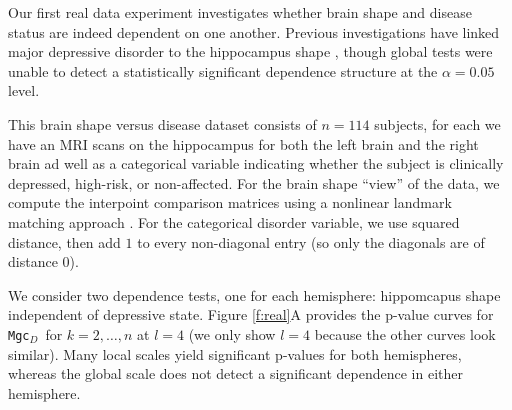 \documentclass[11pt]{article}
\providecommand{\sct}[1]{{\sc \texttt{#1}}}
\newcommand{\Mgc}{\sct{Mgc}}
\newcommand{\Mgcd}{\sct{Mgc$_D$}}
\newcommand{\Hhg}{\sct{Hhg}}
\newcommand{\Dcorr}{\sct{Dcorr}}
\newcommand{\Mcorr}{\sct{Mcorr}}
\newcommand{\Mantel}{\sct{Mantel}}
\begin{document}
Our first real data experiment investigates whether brain shape and disease status are indeed dependent on one another.  Previous investigations have linked major depressive disorder to the hippocampus shape \cite{ParkEtAl2011,PosenerEtAl2003}, though global tests were unable to detect a statistically significant dependence structure at the $\alpha=0.05$ level.


This brain shape versus disease dataset consists of $n=114$ subjects, for each we have an MRI scans on the hippocampus for both the left brain and the right brain ad well as a categorical variable indicating whether the subject is clinically depressed, high-risk, or non-affected.   For the brain shape ``view'' of the data, we compute the interpoint comparison matrices using a nonlinear landmark matching approach \cite{ParkEtAl2011,LLDMM}.
For the categorical disorder variable,
we use squared distance, then add $1$ to every non-diagonal entry (so only the diagonals are of distance $0$).

We consider two dependence tests, one for each hemisphere: hippomcapus shape independent of depressive state.  
Figure \ref{f:real}A provides the p-value curves for \Mgcd~for $k=2,\ldots,n$ at $l=4$  (we only show $l=4$ because the other curves look similar). Many local scales yield significant p-values for both hemispheres, whereas the global scale does not detect a significant dependence in either hemisphere. 
\end{document}
